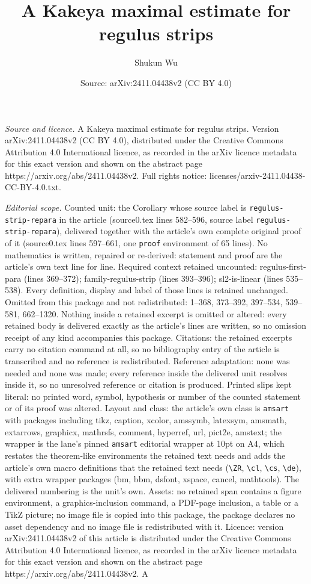 \documentclass[10pt,a4paper]{amsart}
\title[A Kakeya maximal estimate for regulus strips]{A Kakeya maximal estimate for regulus strips}
\author{Shukun Wu}
\date{Source: arXiv:2411.04438v2 (CC BY 4.0)}
\begin{document}
\maketitle

\noindent\emph{Source and licence.} A Kakeya maximal estimate for regulus strips. Version arXiv:2411.04438v2 (CC BY 4.0), distributed under the Creative Commons Attribution 4.0 International licence, as recorded in the arXiv licence metadata for this exact version and shown on the abstract page https://arxiv.org/abs/2411.04438v2. Full rights notice: licenses/arxiv-2411.04438-CC-BY-4.0.txt.\par\smallskip

\noindent\textit{Editorial scope.} Counted unit: the Corollary whose source label is \texttt{regulus-strip-repara} in the article (source0.tex lines 582--596, source label \texttt{regulus-strip-repara}), delivered together with the article's own complete original proof of it (source0.tex lines 597--661, one \texttt{proof} environment of 65 lines). No mathematics is written, repaired or re-derived: statement and proof are the article's own text line for line. Required context retained uncounted: regulus-first-para (lines 369--372); family-regulus-strip (lines 393--396); sl2-is-linear (lines 535--538). Every definition, display and label of those lines is retained unchanged. Omitted from this package and not redistributed: 1--368, 373--392, 397--534, 539--581, 662--1320. Nothing inside a retained excerpt is omitted or altered: every retained body is delivered exactly as the article's lines are written, so no omission receipt of any kind accompanies this package. Citations: the retained excerpts carry no citation command at all, so no bibliography entry of the article is transcribed and no reference is redistributed. Reference adaptation: none was needed and none was made; every reference inside the delivered unit resolves inside it, so no unresolved reference or citation is produced. Printed slips kept literal: no printed word, symbol, hypothesis or number of the counted statement or of its proof was altered. Layout and class: the article's own class is \texttt{amsart} with packages including tikz, caption, xcolor, amssymb, latexsym, amsmath, extarrows, graphicx, mathrsfs, comment, hyperref, url, pict2e, amstext; the wrapper is the lane's pinned \texttt{amsart} editorial wrapper at 10pt on A4, which restates the theorem-like environments the retained text needs and adds the article's own macro definitions that the retained text needs (\texttt{\textbackslash ZR}, \texttt{\textbackslash cl}, \texttt{\textbackslash cs}, \texttt{\textbackslash de}), with extra wrapper packages (bm, bbm, dsfont, xspace, cancel, mathtools). The delivered numbering is the unit's own. Assets: no retained span contains a figure environment, a graphics-inclusion command, a PDF-page inclusion, a table or a TikZ picture; no image file is copied into this package, the package declares no asset dependency and no image file is redistributed with it. Licence: version arXiv:2411.04438v2 of this article is distributed under the Creative Commons Attribution 4.0 International licence, as recorded in the arXiv licence metadata for this exact version and shown on the abstract page https://arxiv.org/abs/2411.04438v2. A 
\end{document}
